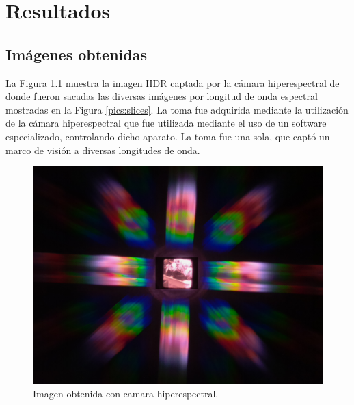 
\chapter{Resultados} %
\label{Capitulo4}

\section{Imágenes obtenidas}
La Figura \ref{pics:originalHDR} muestra la imagen HDR captada por la cámara hiperespectral de donde fueron sacadas las diversas imágenes por longitud de onda espectral mostradas en la Figura \ref{pics:slices}. La toma fue adquirida mediante la utilización de la cámara hiperespectral que fue utilizada mediante el uso de un software especializado, controlando dicho aparato. La toma fue una sola, que captó un marco de visión a diversas longitudes de onda.
\begin{figure}[h]
\begin{center}
\includegraphics[scale=.3]{./images/RESULTS/original.png}
\end{center}
\caption{Imagen obtenida con camara hiperespectral.}
\label{pics:originalHDR}
\end{figure}

